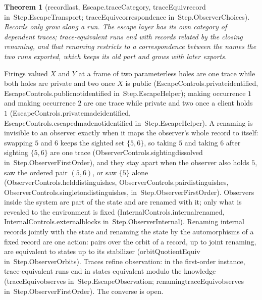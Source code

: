 \documentclass[11pt]{article}
\newtheorem{theorem}{Theorem}
\theoremstyle{remark}
\newcommand{\lean}[1]{{\ttfamily\def\_{\textunderscore\allowbreak}#1}}
\newcommand{\inmod}[1]{in~{\ttfamily\def\_{\textunderscore\allowbreak}#1}}
\begin{document}
\begin{theorem}[\lean{record\_last}, \lean{Escape.traceCategory}, \lean{traceEquiv\_record} \inmod{Step.EscapeTransport}; \lean{traceEquiv\_correspondence} \inmod{Step.ObserverChoices}]
Records only grow along a run. The escape layer has its own category of dependent traces;
trace-equivalent runs end with records related by the closing renaming, and that renaming restricts to
a correspondence between the names the two runs exported, which keeps its old part and grows with
later exports.
\end{theorem}

Firings valued $X$ and $Y$ at a frame of two parameterless holes are one trace while both holes are
private and two once $X$ is public (\lean{EscapeControls.private\_identified},
\lean{EscapeControls.public\_not\_identified} \inmod{Step.EscapeHelper}); making occurrence $1$ and making
occurrence $2$ are one trace while private and two once a client holds $1$
(\lean{EscapeControls.private\_made\_identified}, \lean{EscapeControls.escaped\_made\_not\_identified} \inmod{Step.EscapeHelper}). A
renaming is invisible to an observer exactly when it maps the observer's whole record to itself:
swapping $5$ and $6$ keeps the sighted set $\{5,6\}$, so taking $5$ and taking $6$ after sighting
$\{5,6\}$ are one trace (\lean{ObserverControls.sighting\_dissolved} \inmod{Step.ObserverFirstOrder}), and
they stay apart when the observer also holds $5$, saw the ordered pair $(5,6)$, or saw $\{5\}$ alone
(\lean{ObserverControls.held\_distinguishes}, \lean{ObserverControls.pair\_distinguishes},
\lean{ObserverControls.singleton\_distinguishes}, \inmod{Step.ObserverFirstOrder}). Observers inside the system are part of the state and
are renamed with it; only what is revealed to the environment is fixed (\lean{InternalControls.internal\_renamed},
\lean{InternalControls.external\_blocks} \inmod{Step.ObserverInternal}). Renaming internal records jointly with
the state and renaming the state by the automorphisms of a fixed record are one action: pairs over the
orbit of a record, up to joint renaming, are equivalent to states up to its stabilizer
(\lean{orbitQuotientEquiv} \inmod{Step.ObserverOrbits}). Traces refine observation: in the first-order
instance, trace-equivalent runs end in states equivalent modulo the knowledge
(\lean{traceEquiv\_observes} \inmod{Step.EscapeObservation}; \lean{renaming\_traceEquiv\_observes}
\inmod{Step.ObserverFirstOrder}). The converse is open.
\end{document}
